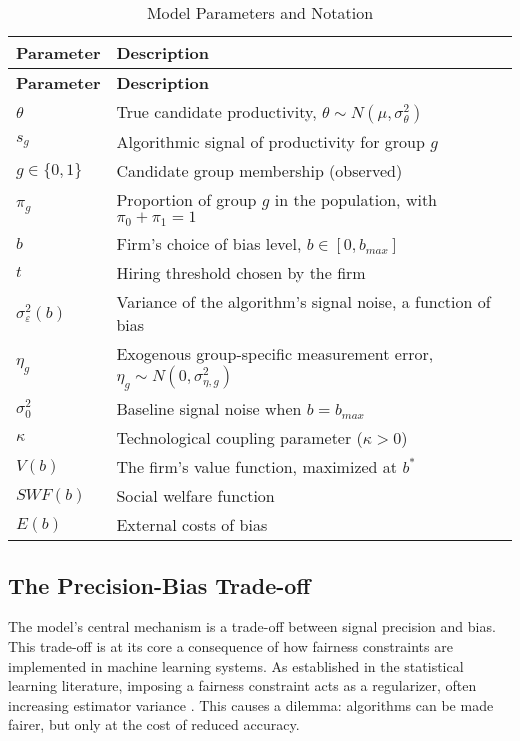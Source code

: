 \begin{longtable}{@{}ll@{}}
\caption{Model Parameters and Notation}
\label{tab:params}\\
\toprule
\textbf{Parameter} & \textbf{Description} \\ \midrule
\endfirsthead
\toprule
\textbf{Parameter} & \textbf{Description} \\ \midrule
\endhead
\bottomrule
\endfoot
$\theta$ & True candidate productivity, $\theta \sim N(\mu, \sigma_\theta^2)$ \\
$s_g$ & Algorithmic signal of productivity for group $g$ \\
$g \in \{0,1\}$ & Candidate group membership (observed) \\
$\pi_g$ & Proportion of group $g$ in the population, with $\pi_0+\pi_1=1$ \\
$b$ & Firm's choice of bias level, $b \in [0, b_{max}]$ \\
$t$ & Hiring threshold chosen by the firm \\
$\sigma_\varepsilon^2(b)$ & Variance of the algorithm's signal noise, a function of bias \\
$\eta_g$ & Exogenous group-specific measurement error, $\eta_g \sim N(0, \sigma_{\eta,g}^2)$ \\
$\sigma_0^2$ & Baseline signal noise when $b=b_{max}$ \\
$\kappa$ & Technological coupling parameter ($\kappa>0$) \\
$V(b)$ & The firm's value function, maximized at $b^*$ \\
$SWF(b)$ & Social welfare function \\
$E(b)$ & External costs of bias \\
\end{longtable}


\subsection{The Precision-Bias Trade-off}
The model's central mechanism is a trade-off between signal precision and bias. This trade-off is at its core a consequence of how fairness constraints are implemented in machine learning systems. As established in the statistical learning literature, imposing a fairness constraint acts as a regularizer, often increasing estimator variance \citep{Kamishima2012, Wick2019}. This causes a dilemma: algorithms can be made fairer, but only at the cost of reduced accuracy.

